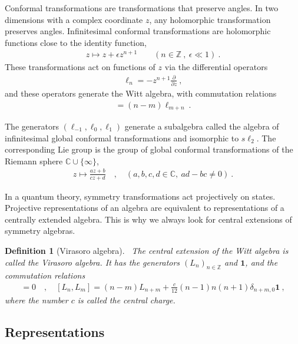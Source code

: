 \documentclass[12pt, a4paper]{article}
\theoremstyle{break}
\newtheorem{defn}[exo]{Definition}
\begin{document}
Conformal transformations are transformations that preserve angles. 
In two dimensions with a complex coordinate $z$, any holomorphic transformation preserves angles.
Infinitesimal conformal transformations are holomorphic functions close to the identity function, 
\begin{align}
 z \mapsto z + \epsilon z^{n+1}\qquad (n\in\mathbb{Z}\ , \ \epsilon\ll 1) \ .
\end{align}
These transformations act on functions of $z$ via the differential operators 
\begin{align}
 \ell_n = -z^{n+1}\frac{\partial}{\partial z}\ ,
\end{align}
and these operators generate the Witt algebra, with commutation relations
\begin{align}
 [\ell_n,\ell_m ] = (n-m)\ell_{m+n}\ .
\end{align}

The generators $(\ell_{-1},\ell_0,\ell_1)$ generate a subalgebra called the algebra of infinitesimal global conformal transformations and isomorphic to $s\ell_2$.  The corresponding Lie group is the group of global conformal transformations of 
the Riemann sphere $\mathbb{C}\cup \{\infty\}$,
\begin{align}
 z \mapsto \frac{az+b}{cz+d}\quad , \quad (a,b,c,d\in \mathbb{C},\ ad-bc\neq 0)\ .
\end{align}

In a quantum theory, symmetry transformations act projectively on states. 
Projective representations of an algebra are equivalent to representations of a centrally extended algebra. 
This is why we always look for central extensions of symmetry algebras.

\begin{defn}[Virasoro algebra]
 ~\label{def:vir}
 The central extension of the Witt algebra is called the Virasoro algebra. It has the generators $(L_n)_{n\in\mathbb{Z}}$ and $\mathbf 1$, and the commutation relations
 \begin{align}
  [\mathbf 1, L_n] = 0 \quad , \quad [L_n,L_m] = (n-m)L_{n+m} +\frac{c}{12}(n-1)n(n+1)\delta_{n+m,0}\mathbf 1 \ ,
  \label{eq:vir}
 \end{align}
 where the number $c$ is called the central charge. 
\end{defn}

\subsection{Representations}
\end{document}
